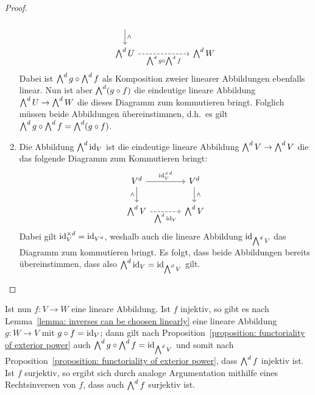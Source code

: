 \begin{proof}
\begin{enumerate}
\[\begin{tikzcd}[column sep = 6em]
            \arrow{d}{\wedge}
          \\
            \exteriorpower{d}{U}
            \arrow[swap, dashed]{r}{\exteriorpower{d}{g}\circ \exteriorpower{d}{f}}
          & \exteriorpower{d}{W}
        \end{tikzcd}
      \]
      Dabei ist $\bigwedge^{d} g \circ \bigwedge^{d} f$ als Komposition zweier linearer Abbildungen ebenfalls linear.
      Nun ist aber $\bigwedge^{d} (g \circ f)$ die eindeutige lineare Abbildung $\bigwedge^{d} U \to \bigwedge^{d} W$ die dieses Diagramm zum kommutieren bringt.
      Folglich müssen beide Abbildungen übereinstimmen, d.h.\ es gilt $\bigwedge^{d} g \circ \bigwedge^{d} f = \bigwedge^{d} (g \circ f)$.
      
    \item
      Die Abbildung $\bigwedge^{d} \operatorname{id}_V$ ist die eindeutige lineare Abbildung $\bigwedge^{d} V \to \bigwedge^{d} V$ die das folgende Diagramm zum Kommutieren bringt:
      \[
        \begin{tikzcd}[column sep = large]
            V^d
            \arrow{r}{\id_V^{\times d}}
            \arrow[swap]{d}{\wedge}
          & V^d
            \arrow{d}{\wedge}
          \\
            \exteriorpower{d}{V}
            \arrow[swap, dashed]{r}{\exteriorpower{d}{\id_V}}
          & \exteriorpower{d}{V}
        \end{tikzcd}
      \]
      Dabei gilt $\operatorname{id}_V^{\times d} = \operatorname{id}_{V^d}$, weshalb auch die lineare Abbildung $\operatorname{id}_{\bigwedge^{d} V}$ das Diagramm zum kommutieren bringt.
      Es folgt, dass beide Abbildungen bereits übereinstimmen, dass also $\bigwedge^{d} \operatorname{id}_V = \operatorname{id}_{\bigwedge^{d} V}$ gilt.
    \qedhere
  \end{enumerate}
\end{proof}

Ist nun $f \colon V \to W$ eine lineare Abbildung.
Ist $f$ injektiv, so gibt es nach Lemma~\ref{lemma: inverses can be choosen linearly} eine lineare Abbildung $g \colon W \to V$ mit $g \circ f = \operatorname{id}_V$;
dann gilt nach Proposition~\ref{proposition: functoriality of exterior power} auch $\bigwedge^{d} g \circ \bigwedge^{d} f = \operatorname{id}_{\bigwedge^{d} V}$ und somit nach Proposition~\ref{proposition: functoriality of exterior power}, dass $\bigwedge^{d} f$ injektiv ist.
Ist $f$ surjektiv, so ergibt sich durch analoge Argumentation mithilfe eines Rechtsinversen von $f$, dass auch $\bigwedge^{d} f$ surjektiv ist.





